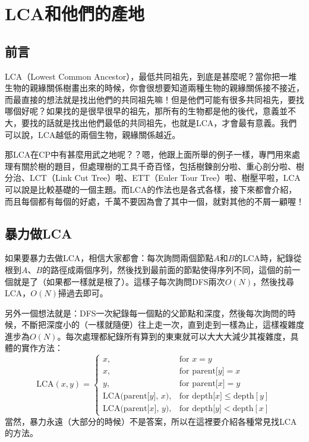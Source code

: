 \documentclass[main.tex]{subfiles}
\begin{document}
\chapter{LCA和他們的產地}
	\section{前言}
	LCA（Lowest Common Ancestor），最低共同祖先，到底是甚麼呢？當你把一堆生物的親緣關係樹畫出來的時候，你會很想要知道兩種生物的親緣關係接不接近，而最直接的想法就是找出他們的共同祖先嘛！但是他們可能有很多共同祖先，要找哪個好呢？如果找的是很早很早的祖先，那所有的生物都是他的後代，意義並不大，要找的話就是找出他們最低的共同祖先，也就是LCA，才會最有意義。我們可以說，LCA越低的兩個生物，親緣關係越近。
	
	那LCA在CP中有甚麼用武之地呢？？嗯，他跟上面所舉的例子一樣，專門用來處理有關於樹的題目，但處理樹的工具千奇百怪，包括樹鍊剖分啦、重心剖分啦、樹分治、LCT（Link Cut Tree）啦、ETT（Euler Tour Tree）啦、樹壓平啦，LCA可以說是比較基礎的一個主題。而LCA的作法也是各式各樣，接下來都會介紹，而且每個都有每個的好處，千萬不要因為會了其中一個，就對其他的不屑一顧喔！
	
	\section{暴力做LCA}
		如果要暴力去做LCA，相信大家都會：每次詢問兩個節點$A$和$B$的LCA時，紀錄從根到$A$、$B$的路徑成兩個序列，然後找到最前面的節點使得序列不同，這個的前一個就是了（如果都一樣就是根了）。這樣子每次詢問DFS兩次$O(N)$，然後找尋LCA，$O(N)$掃過去即可。
		
		另外一個想法就是：DFS一次紀錄每一個點的父節點和深度，然後每次詢問的時候，不斷把深度小的（一樣就隨便）往上走一次，直到走到一樣為止，這樣複雜度進步為$O(N)$。每次處理都紀錄所有算到的東東就可以大大大減少其複雜度，具體的實作方法：
		$$\text{LCA}(x, y) = \begin{cases}
			x, &\text{for  } x = y\\
			x, &\text{for  } \text{parent[} y \text{]} = x\\
			y, &\text{for  } \text{parent[} x \text{]} = y\\
			\text{LCA(parent[} y \text{], } x \text{)}, &\text{for  } \text{depth[} x \text{]} \leq \text{depth}[y]\\
			\text{LCA(parent[} x \text{], } y \text{)}, &\text{for  } \text{depth[} y \text{]} < \text{depth}[x]
		\end{cases}$$		
		當然，暴力永遠（大部分的時候）不是答案，所以在這裡要介紹各種常見找LCA的方法。
\end{document}
